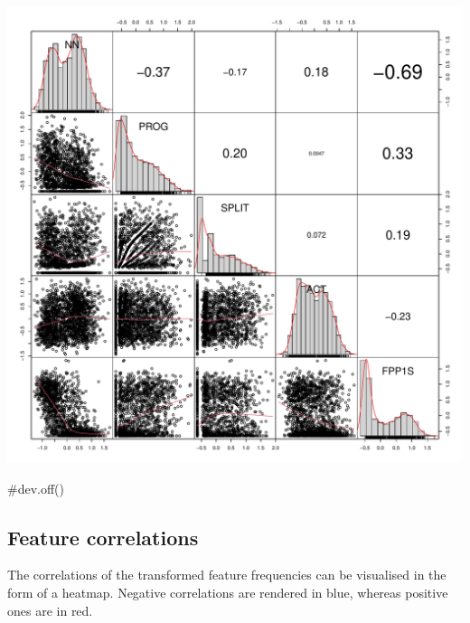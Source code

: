 \documentclass[
  letterpaper,
  DIV=11,
  numbers=noendperiod]{scrreprt}
\newenvironment{Shaded}{\begin{snugshade}}{\end{snugshade}}
\newcommand{\CommentTok}[1]{\textcolor[rgb]{0.37,0.37,0.37}{#1}}
\begin{document}
\includegraphics{AppendixE_files/figure-pdf/example-correlation-plots2-1.pdf}

\begin{Shaded}
\begin{Highlighting}[]
\CommentTok{\#dev.off()}
\end{Highlighting}
\end{Shaded}

\subsection{Feature correlations}\label{feature-correlations}

The correlations of the transformed feature frequencies can be
visualised in the form of a heatmap. Negative correlations are rendered
in blue, whereas positive ones are in red.
\end{document}
